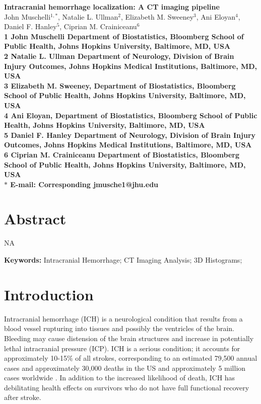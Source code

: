 \documentclass[10pt]{article}\usepackage[]{graphicx}\usepackage[]{color}
\date{}
\begin{document}
\begin{flushleft}
{\Large
\textbf{Intracranial hemorrhage localization: A CT imaging pipeline}
}
\\
John Muschelli$^{1,\ast}$,  
Natalie L. Ullman$^{2}$,
Elizabeth M. Sweeney$^{3}$,
Ani Eloyan$^{4}$,
Daniel F. Hanley$^{5}$,
Ciprian M. Crainiceanu$^{6}$
\\
\bf{1} John Muschelli Department of Biostatistics, Bloomberg School of Public Health, Johns Hopkins University, Baltimore, MD, USA
\\
\bf{2} Natalie L. Ullman Department of Neurology, Division of Brain Injury Outcomes,  Johns Hopkins Medical Institutions, Baltimore, MD, USA
\\
\bf{3} Elizabeth M. Sweeney, Department of Biostatistics, Bloomberg School of Public Health, Johns Hopkins University, Baltimore, MD, USA
\\
\bf{4} Ani Eloyan, Department of Biostatistics, Bloomberg School of Public Health, Johns Hopkins University, Baltimore, MD, USA
\\
\bf{5} Daniel F. Hanley Department of Neurology, Division of Brain Injury Outcomes,  Johns Hopkins Medical Institutions, Baltimore, MD, USA
\\
\bf{6} Ciprian M. Crainiceanu Department of Biostatistics, Bloomberg School of Public Health, Johns Hopkins University, Baltimore, MD, USA
\\
$\ast$ E-mail: Corresponding jmusche1@jhu.edu
\end{flushleft}


\section*{Abstract}

NA

{\bf Keywords:} Intracranial Hemorrhage; CT Imaging Analysis; 3D Histograms;













\section*{Introduction}

Intracranial hemorrhage (ICH) is a neurological condition that results from a blood vessel rupturing into tissues and possibly the ventricles of the brain.  Bleeding may cause distension of the brain structures and increase in potentially lethal intracranial pressure (ICP).  ICH is a serious condition; it accounts for approximately 10-15\% of all strokes, corresponding to an estimated 79,500 annual cases \citep{go_heart_2013} and approximately 30,000 deaths \citep{qureshi_spontaneous_2001} in the US and approximately 5 million cases worldwide \citep{krishnamurthi_global_2014}. In addition to the increased likelihood of death, ICH has debilitating health effects on survivors who do not have full functional recovery after stroke.
\end{document}
